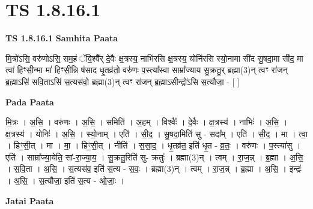 \documentclass[17pt]{extarticle}
\begin{document}
\section{ TS 1.8.16.1 }

\textbf{TS 1.8.16.1 } \newline
\textbf{Samhita Paata} \newline

मि॒त्रो॑ऽसि॒ वरु॑णोऽसि॒ सम॒हं ॅवि॒श्वै᳚र् दे॒वैः क्ष॒त्रस्य॒ नाभि॑रसि क्ष॒त्रस्य॒ योनि॑रसि स्यो॒नामा सी॑द सु॒षदा॒मा सी॑द॒ मा त्वा॑ हिꣳसी॒न्मा मा॑ हिꣳसी॒न्नि ष॑साद धृ॒तव्र॑तो॒ वरु॑णः प॒स्त्या᳚स्वा साम्रा᳚ज्याय सु॒क्रतु॒र् ब्रह्मा(3)न् त्वꣳ रा॑जन् ब्र॒ह्माऽसि॑ सवि॒ताऽसि॑ स॒त्यस॑वो॒ ब्रह्मा(3)न् त्वꣳ रा॑जन् ब्र॒ह्माऽसीन्द्रो॑ऽसि स॒त्यौजा॒ - [ ] \newline

\textbf{Pada Paata} \newline

मि॒त्रः । अ॒सि॒ । वरु॑णः । अ॒सि॒ । समिति॑ । अ॒हम् । विश्वैः᳚ । दे॒वैः । क्ष॒त्रस्य॑ । नाभिः॑ । अ॒सि॒ । क्ष॒त्रस्य॑ । योनिः॑ । अ॒सि॒ । स्यो॒नाम् । एति॑ । सी॒द॒ । सु॒षदा॒मिति॑ सु - सदा᳚म् । एति॑ । सी॒द॒ । मा । त्वा॒ । हिꣳ॒॒सी॒त् । मा । मा॒ । हिꣳ॒॒सी॒त् । नीति॑ । स॒सा॒द॒ । धृ॒तव्र॑त॒ इति॑ धृ॒त - व्र॒तः॒ । वरु॑णः । प॒स्त्या॑सु । एति॑ । साम्रा᳚ज्या॒येति॒ सां-रा॒ज्या॒य॒ । सु॒क्रतु॒रिति॑ सु- क्रतुः॑ । ब्रह्मा(3)न् । त्वम् । रा॒ज॒न्न् । ब्र॒ह्मा । अ॒सि॒ । स॒वि॒ता । अ॒सि॒ । स॒त्यस॑व॒ इति॑ स॒त्य - स॒वः॒ । ब्रह्मा(3)न् । त्वम् । रा॒ज॒न्न् । ब्र॒ह्मा । अ॒सि॒ । इन्द्रः॑ । अ॒सि॒ । स॒त्यौजा॒ इति॑ स॒त्य - ओ॒जाः॒ ।  \newline



\textbf{Jatai Paata} \newline
\end{document}
